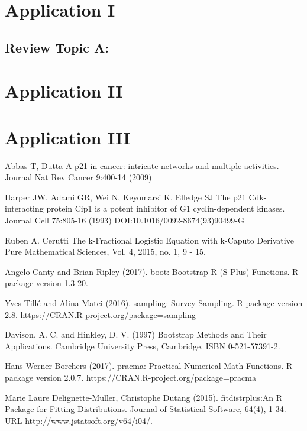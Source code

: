 
\begin{thebibliography}{00}

\section{Application I}

\subsection{Review Topic A:}

\section{Application II}

\section{Application III}

Abbas T, Dutta A
\newblock p21 in cancer: intricate networks and multiple activities.
\newblock Journal Nat Rev Cancer 9:400-14 (2009)

Harper JW, Adami GR, Wei N, Keyomarsi K, Elledge SJ
\newblock The p21 Cdk-interacting protein Cip1 is a potent inhibitor of G1 cyclin-dependent kinases.
\newblock Journal Cell 75:805-16 (1993) DOI:10.1016/0092-8674(93)90499-G

 Ruben A. Cerutti
\newblock The k-Fractional Logistic Equation with k-Caputo Derivative
\newblock Pure Mathematical Sciences, Vol.  4, 2015, no.  1, 9 - 15.

 Angelo Canty and Brian Ripley (2017). 
\newblock boot: Bootstrap R (S-Plus) Functions. 
\newblock R package version 1.3-20.

Yves Tillé and Alina Matei (2016). 
\newblock sampling: Survey Sampling. 
\newblock R package version 2.8. https://CRAN.R-project.org/package=sampling

 Davison, A. C. and Hinkley, D. V. (1997) 
\newblock Bootstrap Methods and Their Applications. 
\newblock Cambridge University Press, Cambridge. ISBN 0-521-57391-2.

Hans Werner Borchers (2017). 
\newblock pracma: Practical Numerical Math Functions. 
\newblock R package version 2.0.7. https://CRAN.R-project.org/package=pracma

Marie Laure Delignette-Muller, Christophe Dutang (2015). 
\newblock fitdistrplus:An R Package for Fitting Distributions. 
\newblock Journal of Statistical Software, 64(4), 1-34. URL http://www.jstatsoft.org/v64/i04/.


\end{thebibliography}
